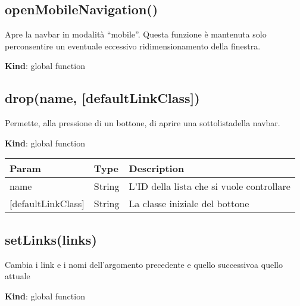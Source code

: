 \hypertarget{openmobilenavigation}{%
\subsection{openMobileNavigation()}\label{openmobilenavigation}}

Apre la navbar in modalità ``mobile''. Questa funzione è mantenuta solo
perconsentire un eventuale eccessivo ridimensionamento della finestra.

\textbf{Kind}: global function\\

\hypertarget{dropname-defaultlinkclass}{%
\subsection{drop(name,
{[}defaultLinkClass{]})}\label{dropname-defaultlinkclass}}

Permette, alla pressione di un bottone, di aprire una sottolistadella
navbar.

\textbf{Kind}: global function

\begin{longtable}[]{@{}lll@{}}
\toprule
Param & Type & Description\tabularnewline
\midrule
\endhead
name & String & L'ID della lista che si vuole controllare\tabularnewline
{[}defaultLinkClass{]} & String & La classe iniziale del
bottone\tabularnewline
\bottomrule
\end{longtable}

\hypertarget{setlinkslinks}{%
\subsection{setLinks(links)}\label{setlinkslinks}}

Cambia i link e i nomi dell'argomento precedente e quello successivoa
quello attuale

\textbf{Kind}: global function

